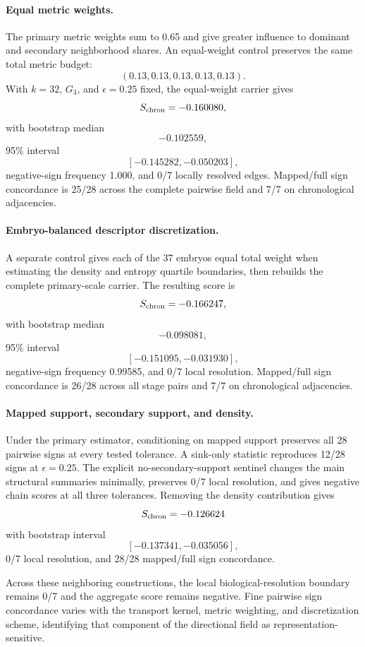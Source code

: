 \documentclass[11pt]{article}
\begin{document}
\paragraph{Equal metric weights.}
The primary metric weights sum to 0.65 and give greater influence to dominant and secondary neighborhood shares. An equal-weight control preserves the same total metric budget:
\[
(0.13,0.13,0.13,0.13,0.13).
\]
With $k=32$, $G_3$, and $\epsilon=0.25$ fixed, the equal-weight carrier gives
\[
S_{\rm chron}=-0.160080,
\]
with bootstrap median
\[
-0.102559,
\]
95\% interval
\[
[-0.145282,-0.050203],
\]
negative-sign frequency 1.000, and 0/7 locally resolved edges. Mapped/full sign concordance is 25/28 across the complete pairwise field and 7/7 on chronological adjacencies.

\paragraph{Embryo-balanced descriptor discretization.}
A separate control gives each of the 37 embryos equal total weight when estimating the density and entropy quartile boundaries, then rebuilds the complete primary-scale carrier. The resulting score is
\[
S_{\rm chron}=-0.166247,
\]
with bootstrap median
\[
-0.098081,
\]
95\% interval
\[
[-0.151095,-0.031930],
\]
negative-sign frequency 0.99585, and 0/7 local resolution. Mapped/full sign concordance is 26/28 across all stage pairs and 7/7 on chronological adjacencies.

\paragraph{Mapped support, secondary support, and density.}
Under the primary estimator, conditioning on mapped support preserves all 28 pairwise signs at every tested tolerance. A sink-only statistic reproduces 12/28 signs at $\epsilon=0.25$. The explicit no-secondary-support sentinel changes the main structural summaries minimally, preserves 0/7 local resolution, and gives negative chain scores at all three tolerances. Removing the density contribution gives
\[
S_{\rm chron}=-0.126624
\]
with bootstrap interval
\[
[-0.137341,-0.035056],
\]
0/7 local resolution, and 28/28 mapped/full sign concordance.


Across these neighboring constructions, the local biological-resolution boundary remains 0/7 and the aggregate score remains negative. Fine pairwise sign concordance varies with the transport kernel, metric weighting, and discretization scheme, identifying that component of the directional field as representation-sensitive.
\end{document}

